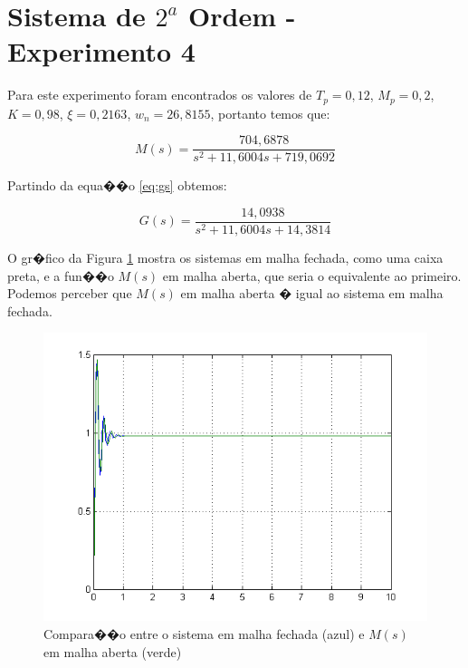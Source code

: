 \documentclass[11pt,a4paper]{report}
\begin{document}
\section{Sistema de $2^{a}$ Ordem - Experimento 4}

Para este experimento foram encontrados os valores de $T_{p} = 0,12$, $M_{p} = 0,2$, $K = 0,98$, $\xi = 0,2163$, $w_{n} = 26,8155$, portanto temos que:

		\[ M(s) = \frac{704,6878}{s^{2}+11,6004s+719,0692}\]
		
		Partindo da equa��o \ref{eq:gs} obtemos:
		
		\[ G(s) = \frac{14,0938}{s^{2}+11,6004s+14,3814}\]
		
		O gr�fico da Figura \ref{fig:sist2ordemindiretacomparacao} mostra os sistemas em malha fechada, como uma caixa preta, e a fun��o $M(s)$ em malha aberta, que seria o equivalente ao primeiro. Podemos perceber que $M(s)$ em malha aberta � igual ao sistema em malha fechada.	
		
		\begin{figure}[h]
			\centering
			\includegraphics[scale=0.75]{./pictures/2ordem_indireta_comparacao.png}
			\caption{Compara��o entre o sistema em malha fechada (azul) e $M(s)$ em malha aberta (verde)}
			\label{fig:sist2ordemindiretacomparacao}			
		\end{figure}
		
		
\end{document}

